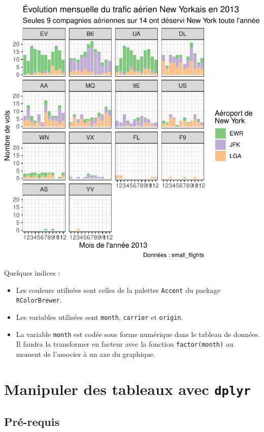 \documentclass[
  a4paper,
  DIV=11,
  numbers=noendperiod,
  oneside]{scrreprt}
\providecommand{\tightlist}{%
  \setlength{\itemsep}{0pt}\setlength{\parskip}{0pt}}\usepackage{longtable,booktabs,array}
\begin{document}
\includegraphics{03-visualization_files/figure-pdf/unnamed-chunk-119-1.pdf}

Quelques indices :

\begin{itemize}
\tightlist
\item
  Les couleurs utilisées sont celles de la palettes \texttt{Accent} du
  package \texttt{RColorBrewer}.
\item
  Les variables utilisées sont \texttt{month}, \texttt{carrier} et
  \texttt{origin}.
\item
  La variable \texttt{month} est codée sous forme numérique dans le
  tableau de données. Il faudra la transformer en facteur avec la
  fonction \texttt{factor(month)} au moment de l'associer à un axe du
  graphique.
\end{itemize}


\chapter{\texorpdfstring{Manipuler des tableaux avec
\texttt{dplyr}}{Manipuler des tableaux avec dplyr}}\label{sec-wrangling}

\section{Pré-requis}\label{pruxe9-requis}
\end{document}
